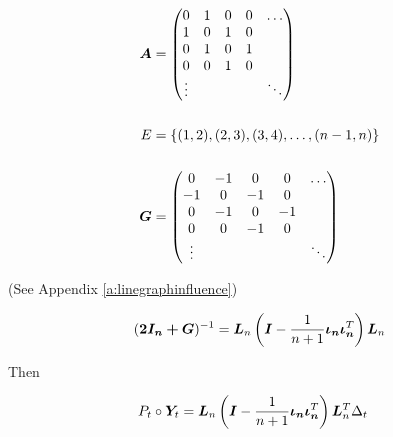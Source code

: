 \vspace{5mm}
\begin{minipage}{.5\textwidth}
    \resizebox{\textwidth}{!}{}
\end{minipage}
\begin{minipage}{.5\textwidth}
    \begin{equation*}
        \begin{split}
            \matr{A} &= \begin{pmatrix}
                0      & 1 & 0 & 0 & \ldots \\
                1      & 0 & 1 & 0 &        \\
                0      & 1 & 0 & 1 &        \\
                0      & 0 & 1 & 0 &        \\
                \vdots &   &   &   & \ddots
            \end{pmatrix} \\
            \vspace{5mm} \\
            E &= \set{(1, 2), (2, 3), (3, 4), \ldots, (n-1, n)} \\
            \vspace{5mm} \\
            \G &= \begin{pmatrix}
                0      & -1 & 0  & 0  & \ldots \\
                -1     & 0  & -1 & 0  &        \\
                0      & -1 & 0  & -1 &        \\
                0      & 0  & -1 & 0  &        \\
                \vdots &    &    &    & \ddots
            \end{pmatrix}
        \end{split}
    \end{equation*}
\end{minipage}
\vspace{5mm}

(See Appendix \ref{a:linegraphinfluence})

\begin{equation}
    (\bm{2I_n + \bm{G}})^{-1} = \bm{L}_n  \left(\bm{I} - \frac{1}{n+1} \bm{\iota_n \iota_n}^T\right) \bm{L}_n
\end{equation}

Then

\begin{equation}
    \begin{split}
        P_t \circ \bm{Y}_t &= \bm{L}_n  \left(\bm{I} - \frac{1}{n+1} \bm{\iota_n \iota_n}^T\right) \bm{L}_n^T  \Delta_t
    \end{split}
\end{equation}

